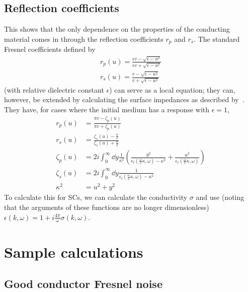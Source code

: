 \documentclass[11pt]{article}
\begin{document}
	\subsection{Reflection coefficients} \label{subsec:ReflectionCoeffs}
	This shows that the only dependence on the properties of the conducting material comes in through the reflection coefficients $r_p$ and $r_s$.
	The standard Fresnel coefficients defined by
	\begin{align}
		r_p(u) = \frac{\epsilon v - \sqrt{\epsilon - u^2}}{\epsilon v + \sqrt{\epsilon - u^2}} \\
		r_s(u) = \frac{v - \sqrt{\epsilon - u^2}}{v + \sqrt{\epsilon - u^2}}
	\end{align}
	(with relative dielectric constant $\epsilon$) can serve as a local equation;
	they can, however, be extended by calculating the surface impedances as described by~\cite{Ford1984}.
	They have, for cases where the initial medium has a response with $\epsilon = 1$,
	\begin{align}
		r_p(u) &= \frac{\pi v - \zeta_p(u)}{\pi v + \zeta_p(u)} \\
		r_s(u) &= \frac{\zeta_s(u) - \frac{\pi}{v}}{\zeta_s(u) + \frac{\pi}{v}} \\
		\zeta_p(u) &= 2i \int_0^\infty \dd{y} \frac{1}{\kappa^2} \left( \frac{y^2}{\epsilon_t(\frac{\omega}{c}\kappa, \omega) - \kappa^2} + \frac{u^2}{\epsilon_\ell(\frac{\omega}{c}\kappa, \omega)} \right) \\
		\zeta_s(u) &= 2i \int_0^\infty \dd{y} \frac{1}{\epsilon_t(\frac{\omega}{c}\kappa, \omega) - \kappa^2} \\
		\kappa^2 &= u^2 + y^2
	\end{align}
	To calculate this for SCs, we can calculate the conductivity $\sigma$ and use (noting that the arguments of these functions are no longer dimensionless) $\epsilon(k, \omega) = 1 + i \frac{4 \pi}{\omega} \sigma(k, \omega)$.

	\section{Sample calculations} \label{sec:SampleCalcs}

	\subsection{Good conductor Fresnel noise} \label{subsec:sample:fresnelperfect}
\end{document}

